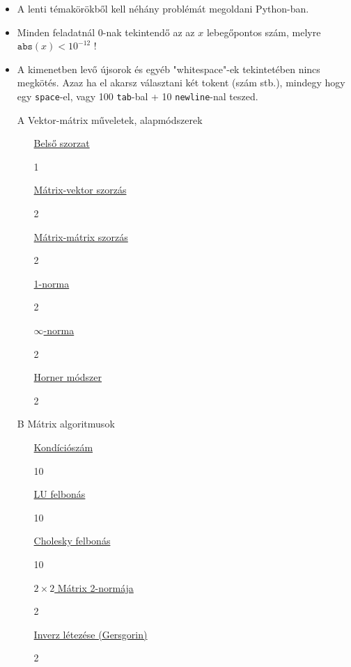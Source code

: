 \documentclass[]{article}
\newcounter{Pontok}
\newcommand{\hreFF}[2]{
\href{#1}{\color{blue}#2}
}
\begin{document}
\begin{itemize}
\item A lenti témakörökből kell néhány problémát  megoldani Python-ban.
\item Minden feladatnál 0-nak tekintendő az az $x$ lebegőpontos szám, melyre
$\texttt{abs}(x)<10^{-12}$ !
\item A kimenetben levő újsorok és egyéb "whitespace"-ek tekintetében nincs megkötés. Azaz
ha el akarsz választani két tokent (szám stb.), mindegy hogy egy \texttt{space}-el, vagy 100 \texttt{tab}-bal + 10
\texttt{newline}-nal teszed.
\end{itemize}


\begin{itemize}
   \item[A] Vektor-mátrix műveletek, alapmódszerek
      \begin{itemize}
         \item[] \hreFF{BelsoSzorzat/desc/desc.pdf}{ Belső szorzat } \dotfill
         \addtocounter{Pontok}{1}1
         \item[] \hreFF{MatrixVektor/desc/desc.pdf}{Mátrix-vektor szorzás} \dotfill
         \addtocounter{Pontok}{2}2
         \item[] \hreFF{MatrixMatrix/desc/desc.pdf}{Mátrix-mátrix szorzás} \dotfill
         \addtocounter{Pontok}{2}2
         \item[] \hreFF{Matrix1Norma/desc/desc.pdf}{1-norma} \dotfill
         \addtocounter{Pontok}{2}2
         \item[] \hreFF{MatrixInfNorma/desc/desc.pdf}{$\infty$-norma} \dotfill
         \addtocounter{Pontok}{2}2
         \item[] \hreFF{Horner/desc/desc.pdf}{Horner módszer} \dotfill
         \addtocounter{Pontok}{2}2
      \end{itemize}

   \item[B] Mátrix algoritmusok
      \begin{enumerate}
         \item[]  \hreFF{Cond/desc/desc.pdf}{Kondíciószám} \dotfill
         \addtocounter{Pontok}{10}10
         \item[]  \hreFF{LU/desc/desc.pdf}{LU felbonás} \dotfill
         \addtocounter{Pontok}{10}10
         \item[]  \hreFF{Chol/desc/desc.pdf}{Cholesky felbonás} \dotfill
         \addtocounter{Pontok}{10}10
         \item[]  \hreFF{M2x2Norma2/desc/desc.pdf}{$2\times 2$ Mátrix 2-normája} \dotfill
         \addtocounter{Pontok}{2}2
         \item[]  \hreFF{Gershgorin/desc/desc.pdf}{Inverz létezése (Gersgorin)} \dotfill
         \addtocounter{Pontok}{2}2
      \end{enumerate}


\end{itemize}
\end{document}
